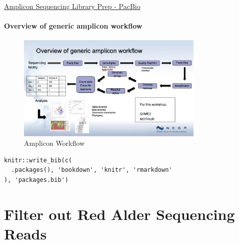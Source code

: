 \documentclass[
]{book}
\begin{document}
\href{https://www.pacb.com/wp-content/uploads/Multiplexed-Amplicon-Library-Preparation-Using-SMRTbell-Express-Template-Prep-Kit-2.0-–-Customer-Training.pdf}{Amplicon Sequencing Library Prep - PacBio}

\hypertarget{overview-of-generic-amplicon-workflow}{%
\subsubsection{Overview of generic amplicon workflow}\label{overview-of-generic-amplicon-workflow}}

\begin{figure}
\centering
\includegraphics[width=0.8\textwidth,height=\textheight]{./Figures/NCGRwkflo.png}
\caption{Amplicon Workflow}
\end{figure}

\begin{verbatim}
knitr::write_bib(c(
  .packages(), 'bookdown', 'knitr', 'rmarkdown'
), 'packages.bib')
\end{verbatim}

\hypertarget{filter-out-red-alder-sequencing-reads}{%
\chapter{Filter out Red Alder Sequencing Reads}\label{filter-out-red-alder-sequencing-reads}}
\end{document}
